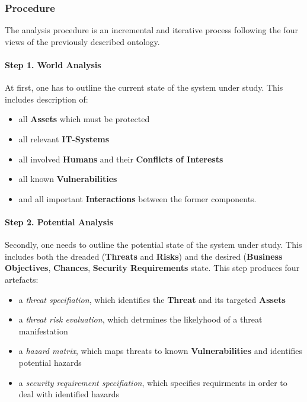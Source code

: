 \subsubsection{Procedure}

The analysis procedure is an incremental and iterative process following
the four views of the previously described ontology.



\paragraph{Step 1. World Analysis}

At first, one has to outline the current state of the system under
study. This includes description of:

\begin{itemize}

\item
  all \textbf{Assets} which must be protected
\item
  all relevant \textbf{IT-Systems}
\item
  all involved \textbf{Humans} and their \textbf{Conflicts of Interests}
\item
  all known \textbf{Vulnerabilities}
\item
  and all important \textbf{Interactions} between the former components.
\end{itemize}

\paragraph{Step 2. Potential Analysis}

Secondly, one needs to outline the potential state of the system under
study. This includes both the dreaded (\textbf{Threats} and
\textbf{Risks}) and the desired (\textbf{Business Objectives},
\textbf{Chances}, \textbf{Security Requirements} state. This step
produces four artefacts:

\begin{itemize}

\item
  a \emph{threat specifiation}, which identifies the \textbf{Threat} and
  its targeted \textbf{Assets}
\item
  a \emph{threat risk evaluation}, which detrmines the likelyhood of a
  threat manifestation
\item
  a \emph{hazard matrix}, which maps threats to known
  \textbf{Vulnerabilities} and identifies potential hazards
\item
  a \emph{security requirement specifiation}, which specifies
  requirments in order to deal with identified hazards
\end{itemize}

